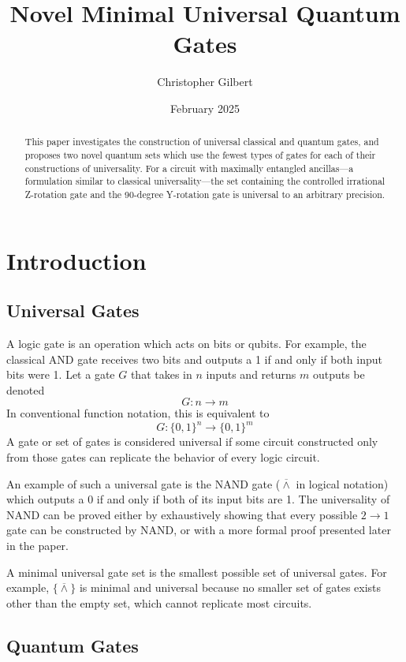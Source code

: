 \documentclass[12pt]{article}
\title{Novel Minimal Universal Quantum Gates}
\author{Christopher Gilbert}
\date{February 2025}
\newcommand{\nand}{\overline{\land}}
\begin{document}
\maketitle
\newpage

\begin{abstract}
This paper investigates the construction of universal classical and quantum gates, and proposes two novel quantum sets which use the fewest types of gates for each of their constructions of universality. For a circuit with  maximally entangled ancillas---a formulation similar to classical universality---the set containing the controlled irrational Z-rotation gate and the 90-degree Y-rotation gate is universal to an arbitrary precision.
\end{abstract}
\newpage

\section{Introduction}

\subsection{Universal Gates}
A logic gate is an operation which acts on bits or qubits. For example, the classical AND gate receives two bits and outputs a 1 if and only if both input bits were 1. Let a gate $G$ that takes in $n$ inputs and returns $m$ outputs be denoted
$$G : n \to m$$
In conventional function notation, this is equivalent to
$$G : \{0, 1\}^n \to \{0, 1\}^m$$
A gate or set of gates is considered universal if some circuit constructed only from those gates can replicate the behavior of every logic circuit.

An example of such a universal gate is the NAND gate ($\nand$ in logical notation) which outputs a 0 if and only if both of its input bits are 1. The universality of NAND can be proved either by exhaustively showing that every possible $2 \to 1$ gate can be constructed by NAND, or with a more formal proof presented later in the paper.

A minimal universal gate set is the smallest possible set of universal gates. For example, $\{ \nand \}$ is minimal and universal because no smaller set of gates exists other than the empty set, which cannot replicate most circuits.

\subsection{Quantum Gates}
\end{document}
